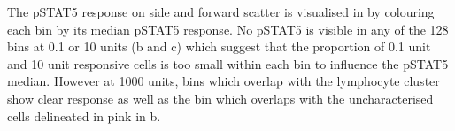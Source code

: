 The pSTAT5 response on side and forward scatter is visualised in  by colouring each bin by its median pSTAT5 response.
No pSTAT5 is visible in any of the 128 bins at 0.1 or 10 units (b and c) which suggest that the proportion of
0.1 unit and 10 unit responsive cells is too small within each bin to influence the pSTAT5 median.
However at 1000 units, bins which overlap with the lymphocyte cluster show clear response as well as the bin which overlaps with the uncharacterised cells
delineated in pink in b.

%

